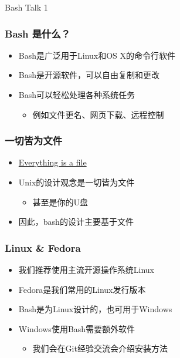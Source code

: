 



\PreFirstFrame
\begin{frame} [fragile]
	\centerline{\fontsize{42}{42}\selectfont Bash Talk 1}
\end{frame}
\PostFirstFrame

\begin{frame}
	\frametitle{Bash 是什么？}
	\linespread{2}
	\begin{itemize}
	\item Bash是广泛用于Linux和OS X的命令行软件
	\item Bash是开源软件，可以自由复制和更改
	\item Bash可以轻松处理各种系统任务
		\begin{itemize}
		\item 例如文件更名、网页下载、远程控制
		\end{itemize}
	\end{itemize}
\end{frame}

\begin{frame} [fragile]
	\frametitle{一切皆为文件}
	\linespread{2}
	\begin{itemize}
	\item \href{https://en.wikipedia.org/wiki/Everything\_is\_a\_file}
				{Everything is a file}
	\item Unix的设计观念是一切皆为文件
		\begin{itemize}
		\item 甚至是你的U盘
		\end{itemize}
	\item 因此，bash的设计主要基于文件
	\end{itemize}
\end{frame}

\begin{frame} [fragile]
	\frametitle{Linux \& Fedora}
	\linespread{2}
	\begin{itemize}
	\item 我们推荐使用主流开源操作系统Linux
	\item Fedora是我们常用的Linux发行版本
	\item Bash是为Linux设计的，也可用于Windows
	\item Windows使用Bash需要额外软件
		\begin{itemize}
		\item 我们会在Git经验交流会介绍安装方法
		\end{itemize}
	\end{itemize}
\end{frame}

